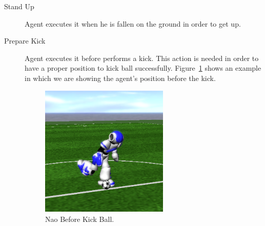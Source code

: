 \begin{description}
 \item[Stand Up] Agent executes it when he is fallen on the ground in order to get up.
 \item[Prepare Kick] Agent executes it before performs a kick. This action is needed in order to have a proper position to kick ball successfully. Figure~\ref{fig:NaoKick} shows an example in which we are showing the agent's position before the kick.
  
  
\begin{figure}[t!]
  \centering
  \includegraphics[trim=0cm 3cm 0cm 4cm, clip,width=0.6\textwidth]{Chapter3/figures/NaoKick.png}
  \caption{Nao Before Kick Ball.}
  \label{fig:NaoKick}
\end{figure}
\end{description}



